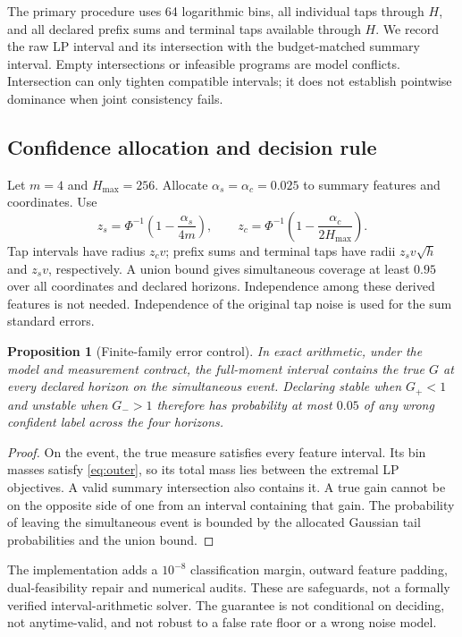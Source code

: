 \documentclass[11pt]{article}
\newtheorem{proposition}{Proposition}[section]
\theoremstyle{remark}\newtheorem{remark}[proposition]{Remark}
\begin{document}
The primary procedure uses 64 logarithmic bins, all individual taps through $H$, and all declared prefix sums and terminal taps available through $H$. We record the raw LP interval and its intersection with the budget-matched summary interval. Empty intersections or infeasible programs are model conflicts. Intersection can only tighten compatible intervals; it does not establish pointwise dominance when joint consistency fails.

\subsection{Confidence allocation and decision rule}
Let $m=4$ and $H_{\max}=256$. Allocate $\alpha_s=\alpha_c=0.025$ to summary features and coordinates. Use
\begin{equation}
 z_s=\Phi^{-1}\left(1-\frac{\alpha_s}{4m}\right),\qquad
 z_c=\Phi^{-1}\left(1-\frac{\alpha_c}{2H_{\max}}\right).
\end{equation}
Tap intervals have radius $z_cv$; prefix sums and terminal taps have radii $z_sv\sqrt h$ and $z_sv$, respectively. A union bound gives simultaneous coverage at least $0.95$ over all coordinates and declared horizons. Independence among these derived features is not needed. Independence of the original tap noise is used for the sum standard errors.

\begin{proposition}[Finite-family error control]\label{prop:coverage}
In exact arithmetic, under the model and measurement contract, the full-moment interval contains the true $G$ at every declared horizon on the simultaneous event. Declaring stable when $G_+<1$ and unstable when $G_->1$ therefore has probability at most $0.05$ of any wrong confident label across the four horizons.
\end{proposition}
\begin{proof}
On the event, the true measure satisfies every feature interval. Its bin masses satisfy \eqref{eq:outer}, so its total mass lies between the extremal LP objectives. A valid summary intersection also contains it. A true gain cannot be on the opposite side of one from an interval containing that gain. The probability of leaving the simultaneous event is bounded by the allocated Gaussian tail probabilities and the union bound.
\end{proof}

The implementation adds a $10^{-8}$ classification margin, outward feature padding, dual-feasibility repair and numerical audits. These are safeguards, not a formally verified interval-arithmetic solver. The guarantee is not conditional on deciding, not anytime-valid, and not robust to a false rate floor or a wrong noise model.
\end{document}
